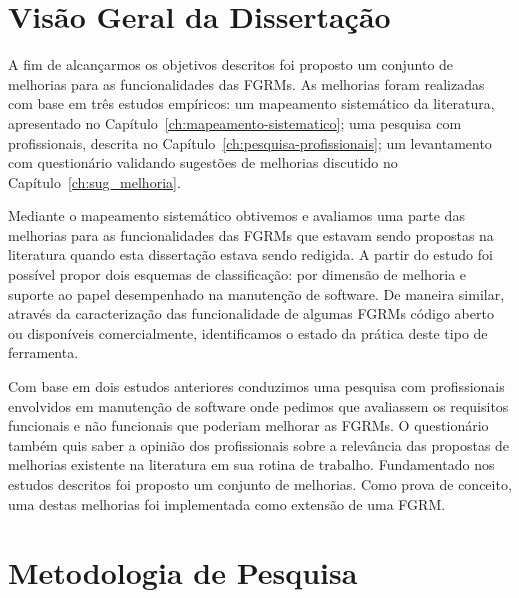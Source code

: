 
\section{Visão Geral da Dissertação}
\label{sec:intro-visao-geral}

A fim de alcançarmos os objetivos descritos foi proposto um conjunto de
melhorias para as funcionalidades das FGRMs. As melhorias foram realizadas com
base em três estudos empíricos: um mapeamento sistemático da literatura,
apresentado no Capítulo~\ref{ch:mapeamento-sistematico}; uma pesquisa com
profissionais, descrita no Capítulo~\ref{ch:pesquisa-profissionais}; um
levantamento com questionário validando sugestões de melhorias discutido no
Capítulo~\ref{ch:sug_melhoria}.

Mediante o mapeamento sistemático obtivemos e avaliamos uma parte das melhorias
para as funcionalidades das FGRMs que estavam sendo propostas na literatura
quando esta dissertação estava sendo redigida. A partir do estudo foi possível
propor dois esquemas de classificação: por dimensão de melhoria e suporte ao
papel desempenhado na manutenção de software. De maneira similar, através da
caracterização das funcionalidade de algumas FGRMs código aberto ou disponíveis
comercialmente, identificamos o estado da prática deste tipo de ferramenta.

Com base em dois estudos anteriores conduzimos uma pesquisa com profissionais
envolvidos em manutenção de software onde pedimos que avaliassem os requisitos
funcionais e não funcionais que poderiam melhorar as FGRMs. O questionário
também quis saber a opinião dos profissionais sobre a relevância das propostas
de me\-lho\-ri\-as existente na literatura em sua rotina de trabalho.
Fundamentado nos estudos descritos foi proposto um conjunto de melhorias. Como
prova de conceito, uma destas melhorias foi implementada como extensão de uma
FGRM\@.

\section{Metodologia de Pesquisa}
\label{sec:intro-metodologia}

